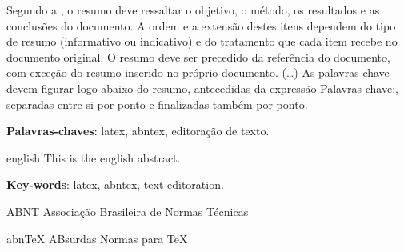 \documentclass[
	12pt,				%
	oneside,			%
	a4paper,			%
	english,			%
	brazil				%
	]{abntex2}
\renewcommand{\listfigurename}{Lista de figuras}%
\begin{document}

\setlength{\absparsep}{18pt} %
\begin{resumo}
 Segundo a , o resumo deve ressaltar o
 objetivo, o método, os resultados e as conclusões do documento. A ordem e a extensão
 destes itens dependem do tipo de resumo (informativo ou indicativo) e do
 tratamento que cada item recebe no documento original. O resumo deve ser
 precedido da referência do documento, com exceção do resumo inserido no
 próprio documento. (\ldots) As palavras-chave devem figurar logo abaixo do
 resumo, antecedidas da expressão Palavras-chave:, separadas entre si por
 ponto e finalizadas também por ponto.

 \noindent
 \textbf{Palavras-chaves}: latex, abntex, editoração de texto.
\end{resumo}

\begin{resumo}[Abstract]
 \begin{otherlanguage*}{english}
   This is the english abstract.

   \noindent
   \textbf{Key-words}: latex, abntex, text editoration.
 \end{otherlanguage*}
\end{resumo}

\pdfbookmark[0]{\listfigurename}{lof}
\listoffigures*
\cleardoublepage

\listoftables*
\cleardoublepage

\begin{siglas}
  \item[ABNT] Associação Brasileira de Normas Técnicas
  \item[abnTeX] ABsurdas Normas para TeX
\end{siglas}

\tableofcontents*
\cleardoublepage


\textual

\end{document}
